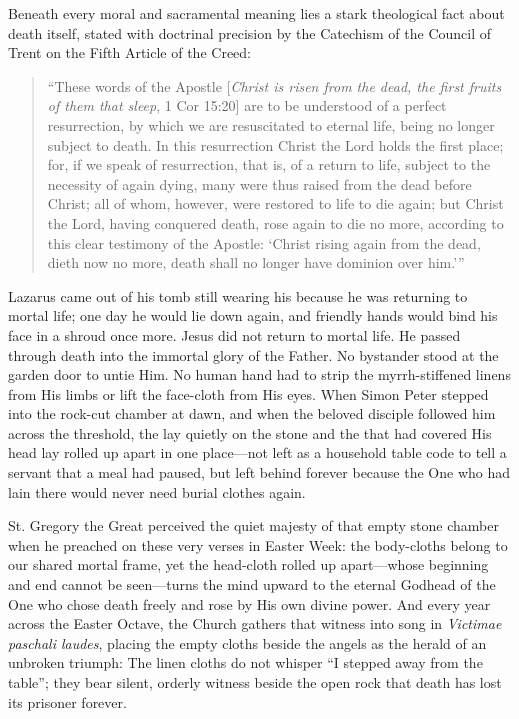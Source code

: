 Beneath every moral and sacramental meaning lies a stark theological fact about death itself, stated with doctrinal precision by the Catechism of the Council of Trent on the Fifth Article of the Creed:
\begin{quote}
``These words of the Apostle [\emph{Christ is risen from the dead, the first fruits of them that sleep}, 1 Cor 15:20] are to be understood of a perfect resurrection, by which we are resuscitated to eternal life, being no longer subject to death. In this resurrection Christ the Lord holds the first place; for, if we speak of resurrection, that is, of a return to life, subject to the necessity of again dying, many were thus raised from the dead before Christ; all of whom, however, were restored to life to die again; but Christ the Lord, having conquered death, rose again to die no more, according to this clear testimony of the Apostle: `Christ rising again from the dead, dieth now no more, death shall no longer have dominion over him.'''
\end{quote}

Lazarus came out of his tomb still wearing his  because he was returning to mortal life; one day he would lie down again, and friendly hands would bind his face in a shroud once more. Jesus did not return to mortal life. He passed through death into the immortal glory of the Father. No bystander stood at the garden door to untie Him. No human hand had to strip the myrrh-stiffened linens from His limbs or lift the face-cloth from His eyes. When Simon Peter stepped into the rock-cut chamber at dawn, and when the beloved disciple followed him across the threshold, the  lay quietly on the stone and the  that had covered His head lay rolled up apart in one place---not left as a household table code to tell a servant that a meal had paused, but left behind forever because the One who had lain there would never need burial clothes again.

St. Gregory the Great perceived the quiet majesty of that empty stone chamber when he preached on these very verses in Easter Week: the body-cloths belong to our shared mortal frame, yet the head-cloth rolled up apart---whose beginning and end cannot be seen---turns the mind upward to the eternal Godhead of the One who chose death freely and rose by His own divine power. And every year across the Easter Octave, the Church gathers that witness into song in \emph{Victimae paschali laudes}, placing the empty cloths beside the angels as the herald of an unbroken triumph:  The linen cloths do not whisper ``I stepped away from the table''; they bear silent, orderly witness beside the open rock that death has lost its prisoner forever.
